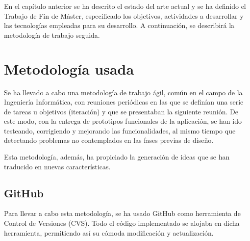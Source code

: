 

En el capítulo anterior se ha descrito el estado del arte actual y se ha definido el Trabajo de Fin de Máster, especificado los objetivos, actividades a desarrollar y las tecnologías empleadas para su desarrollo. A continuación, se describirá la metodología de trabajo seguida.


\section{Metodología usada}
\label{2:sec:1}

Se ha llevado a cabo una metodología de trabajo ágil, común en el campo de la Ingeniería Informática, con reuniones periódicas en las que se definían una serie de tareas u objetivos (iteración) y que se presentaban la siguiente reunión. 
De este modo, con la entrega de prototipos funcionales de la aplicación, se han ido testeando, corrigiendo y mejorando las 
funcionalidades, al mismo tiempo que detectando problemas no contemplados en las fases previas de diseño.

Esta metodología, además, ha propiciado la generación de ideas que se han traducido en nuevas características.


\subsection{GitHub}
\label{subsec:2.1.1}

Para llevar a cabo esta metodología, se ha usado GitHub como herramienta de Control de Versiones (CVS).
Todo el código implementado se alojaba en dicha herramienta, permitiendo así su cómoda modificación y actualización.

